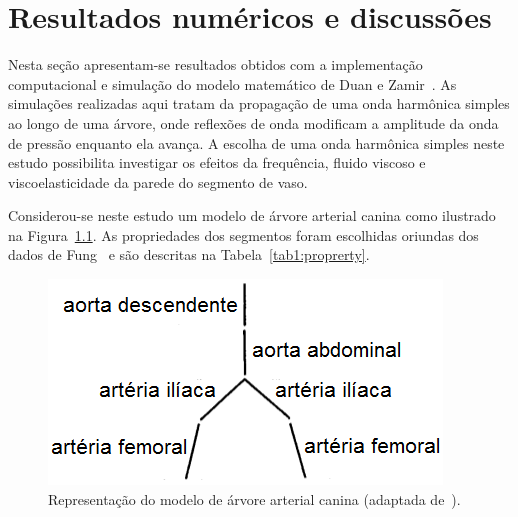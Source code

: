 \documentclass[
        english,			
        brazil			        %
        ,<...>]{abntbibufjf}
\begin{document}

\chapter{Resultados numéricos e discussões}

Nesta seção apresentam-se resultados obtidos com a implementação computacional e simulação do modelo matemático de Duan e Zamir~\cite{Duan}. As simulações realizadas aqui tratam da propagação de uma onda harmônica simples ao longo de uma árvore, onde reflexões de onda modificam a amplitude da onda de pressão enquanto ela avança. A escolha de uma onda harmônica simples neste estudo possibilita investigar os efeitos da frequência, fluido viscoso e viscoelasticidade da parede do segmento de vaso.

Considerou-se neste estudo um modelo de árvore arterial canina como ilustrado na Figura~\ref{fig:arvore-canina}. As propriedades dos segmentos foram escolhidas oriundas dos dados de Fung~\cite{Fung} e são descritas na Tabela~\ref{tab1:proprerty}. 

\begin{figure}[!htbp]
	\centering
	\includegraphics[scale=0.8]{Figures/tree_canine.png}
	\caption{Representação do modelo de árvore arterial canina (adaptada de~\cite{Duan}).}
	\label{fig:arvore-canina}
\end{figure}
\end{document}
